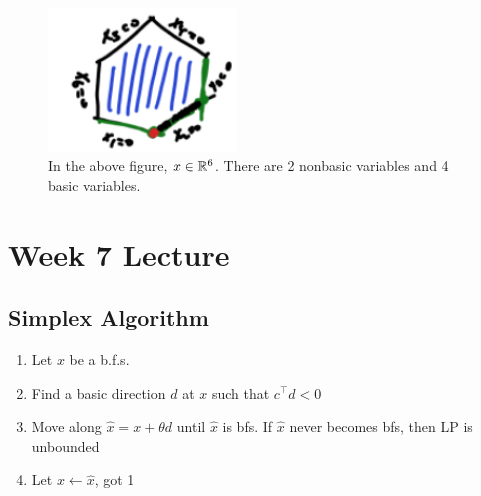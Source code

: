 \documentclass[11pt]{article}
\numberwithin{equation}{section}
\begin{document}
\begin{figure}
    \centering
    \includegraphics[width=5cm]{images/6-ex-7.png}
    \caption{In the above figure, $x \in \mathbb R^6$. There are 2 nonbasic variables and 4 basic variables.}
\end{figure}

\newpage
\section{Week 7 Lecture}
\subsection{Simplex Algorithm}
\begin{enumerate}\addtocounter{enumi}{-1}
    \item Let $x$ be a b.f.s.
    \item Find a basic direction  $d$ at $x$ such that $c^\top d <0$
    \item Move along $\hat{x}=x+\theta d$ until $\hat{x}$ is bfs. If $\hat{x}$ never becomes bfs, then LP is unbounded
    \item Let $x \leftarrow \hat{x}$, got 1
\end{enumerate}
\end{document}
